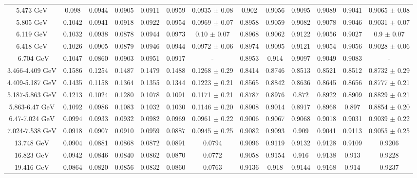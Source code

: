 \documentclass[11pt]{article}
\begin{document}
\begin{table}[htbp]
{\begin{tabular}{ccccccccccccc}
				5.473 ${\textrm{GeV}}$ & 0.098 & 0.0944 & 0.0905 & 0.0911 & 0.0959 & 0.0935 $\pm$ 0.08  & 0.902 & 0.9056 & 0.9095 & 0.9089 & 0.9041 & 0.9065 $\pm$ 0.08  \\
				5.805 ${\textrm{GeV}}$ & 0.1042 & 0.0941 & 0.0918 & 0.0922 & 0.0954 & 0.0969 $\pm$ 0.07  & 0.8958 & 0.9059 & 0.9082 & 0.9078 & 0.9046 & 0.9031 $\pm$ 0.07  \\
				6.119 ${\textrm{GeV}}$ & 0.1032 & 0.0938 & 0.0878 & 0.0944 & 0.0973 & 0.10 $\pm$ 0.07  & 0.8968 & 0.9062 & 0.9122 & 0.9056 & 0.9027 & 0.9 $\pm$ 0.07  \\
				6.418 ${\textrm{GeV}}$ & 0.1026 & 0.0905 & 0.0879 & 0.0946 & 0.0944 & 0.0972 $\pm$ 0.06  & 0.8974 & 0.9095 & 0.9121 & 0.9054 & 0.9056 & 0.9028 $\pm$ 0.06  \\\
				6.704 ${\textrm{GeV}}$ & 0.1047 & 0.0860 & 0.0903 & 0.0951 & 0.0917 & - & 0.8953 & 0.914 & 0.9097 & 0.9049 & 0.9083 & - \\
				\midrule
				3.466-4.409 ${\textrm{GeV}}$ & 0.1586 & 0.1254 & 0.1487 & 0.1479 & 0.1488 & 0.1268 $\pm$ 0.29  & 0.8414 & 0.8746 & 0.8513 & 0.8521 & 0.8512 & 0.8732 $\pm$ 0.29  \\
				4.409-5.187 ${\textrm{GeV}}$ & 0.1435 & 0.1158 & 0.1364 & 0.1355 & 0.1344 & 0.1223 $\pm$ 0.21  & 0.8565 & 0.8842 & 0.8636 & 0.8645 & 0.8656 & 0.8777 $\pm$ 0.21  \\
				5.187-5.863 ${\textrm{GeV}}$ & 0.1213 & 0.1024 & 0.1280 & 0.1078 & 0.1091 & 0.1171 $\pm$ 0.21  & 0.8787 & 0.8976 & 0.872 & 0.8922 & 0.8909 & 0.8829 $\pm$ 0.21  \\
				5.863-6.47 ${\textrm{GeV}}$ & 0.1092 & 0.0986 & 0.1083 & 0.1032 & 0.1030 & 0.1146 $\pm$ 0.20  & 0.8908 & 0.9014 & 0.8917 & 0.8968 & 0.897 & 0.8854 $\pm$ 0.20  \\
				6.47-7.024 ${\textrm{GeV}}$ & 0.0994 & 0.0933 & 0.0932 & 0.0982 & 0.0969 & 0.0961 $\pm$ 0.22  & 0.9006 & 0.9067 & 0.9068 & 0.9018 & 0.9031 & 0.9039 $\pm$ 0.22  \\
				7.024-7.538 ${\textrm{GeV}}$ & 0.0918 & 0.0907 & 0.0910 & 0.0959 & 0.0887 & 0.0945 $\pm$ 0.25  & 0.9082 & 0.9093 & 0.909 & 0.9041 & 0.9113 & 0.9055 $\pm$ 0.25  \\
				\midrule
				13.748 ${\textrm{GeV}}$ & 0.0904 & 0.0881 & 0.0868 & 0.0872 & 0.0891 & 0.0794  & 0.9096 & 0.9119 & 0.9132 & 0.9128 & 0.9109 & 0.9206  \\
				16.823 ${\textrm{GeV}}$ & 0.0942 & 0.0846 & 0.0840 & 0.0862 & 0.0870 & 0.0772  & 0.9058 & 0.9154 & 0.916 & 0.9138 & 0.913 & 0.9228  \\
				19.416 ${\textrm{GeV}}$ & 0.0864 & 0.0820 & 0.0856 & 0.0832 & 0.0860 & 0.0763  & 0.9136 & 0.918 & 0.9144 & 0.9168 & 0.914 & 0.9237  \\

\end{tabular}}
\end{table}
\end{document}
